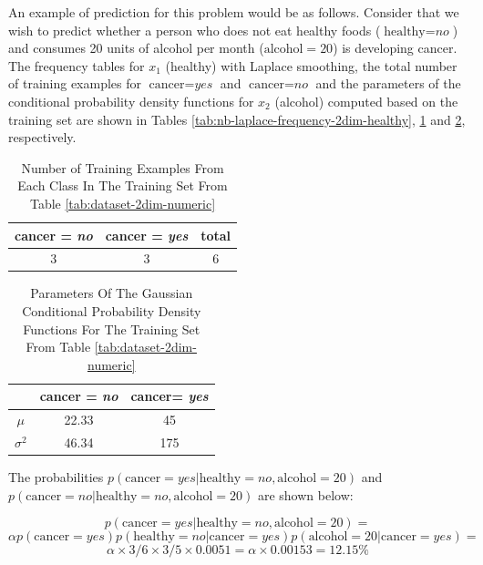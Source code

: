 An example of prediction for this problem would be as follows. Consider that we wish to predict whether a person who does not eat healthy foods ($\text{healthy} = \textit{no}$) and consumes 20 units of alcohol per month ($\text{alcohol} = 20$) is developing cancer. The frequency tables for $x_1$ (healthy) with Laplace smoothing, the total number of training examples for $\text{cancer} = \textit{yes}$ and $\text{cancer} = \textit{no}$ and the parameters of the conditional probability density functions for $x_2$ (alcohol) computed based on the training set are shown in Tables \ref{tab:nb-laplace-frequency-2dim-healthy}, \ref{tab:num-examples-each-class} and \ref{tab:gaussian-parameters}, respectively.

\begin{table}[h]
\caption{Number of Training Examples From Each Class In The Training Set From Table \ref{tab:dataset-2dim-numeric}} \label{tab:num-examples-each-class}
\centering
\begin{tabular}{|c|c|c|}\hline
cancer = \textit{no} & cancer = \textit{yes} & total \\ \hline
3 & 3 & 6 \\ \hline
\end{tabular}
\end{table}


\begin{table}[h]
\caption{Parameters Of The Gaussian Conditional Probability Density Functions For The Training Set From Table \ref{tab:dataset-2dim-numeric}} \label{tab:gaussian-parameters}
\centering
\begin{tabular}{|c|c|c|}\hline
& cancer = \textit{no} & cancer= \textit{yes}  \\ \hline
$\mu$ & 22.33 & 45 \\ \hline
$\sigma^2$ & 46.34 & 175 \\ \hline
\end{tabular}
\end{table}

The probabilities $p(\text{cancer} = \textit{yes} | \text{healthy} = \textit{no}, \text{alcohol} = 20)$ and $p(\text{cancer} = \textit{no} | \text{healthy} = \textit{no}, \text{alcohol} = 20)$ are shown below:

\[ p(\text{cancer} = \textit{yes} | \text{healthy} = \textit{no}, \text{alcohol} = 20) = \]
\[ \alpha p(\text{cancer} = \textit{yes}) p(\text{healthy} = \textit{no} | \text{cancer} = \textit{yes}) p(\text{alcohol} = 20 | \text{cancer} = \textit{yes}) = \]
\[ \alpha \times 3/6 \times 3/5 \times 0.0051 = \alpha \times 0.00153 = 12.15\%\]

